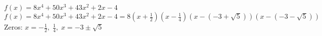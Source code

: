 {$f(x) = 8x^4+50x^3+43x^2+2x-4$}
{$f(x) = 8x^4+50x^3+43x^2+2x-4 = 8\left(x + \frac{1}{2}\right) \left(x - \frac{1}{4}\right)(x - (-3 + \sqrt{5}))(x - (-3 - \sqrt{5}))$ \\
Zeros:  $x = -\frac{1}{2}, \; \frac{1}{4}, \; x = -3 \pm \sqrt{5}$}